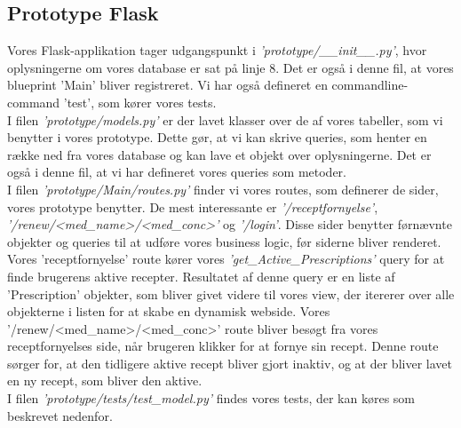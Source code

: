 \subsection{Prototype Flask}
Vores Flask-applikation tager udgangspunkt i \textit{'prototype/\_\_init\_\_.py'}, hvor oplysningerne om vores database er sat på linje 8. Det er også i denne fil, at vores blueprint 'Main' bliver registreret. Vi har også defineret en commandline-command 'test', som kører vores tests.\\
I filen \textit{'prototype/models.py'} er der lavet klasser over de af vores tabeller, som vi benytter i vores prototype. Dette gør, at vi kan skrive queries, som henter en række ned fra vores database og kan lave et objekt over oplysningerne. Det er også i denne fil, at vi har defineret vores queries som metoder.\\
I filen \textit{'prototype/Main/routes.py'} finder vi vores routes, som definerer de sider, vores prototype benytter. De mest interessante er \textit{'/receptfornyelse'}, \textit{'/renew/<med\_name>/<med\_conc>'} og \textit{'/login'}. Disse sider benytter førnævnte objekter og queries til at udføre vores business logic, før siderne bliver renderet. Vores 'receptfornyelse' route kører vores \textit{'get\_Active\_Prescriptions'} query for at finde brugerens aktive recepter. Resultatet af denne query er en liste af 'Prescription' objekter, som bliver givet videre til vores view, der itererer over alle objekterne i listen for at skabe en dynamisk webside. Vores '/renew/<med\_name>/<med\_conc>' route bliver besøgt fra vores receptfornyelses side, når brugeren klikker for at fornye sin recept. Denne route sørger for, at den tidligere aktive recept bliver gjort inaktiv, og at der bliver lavet en ny recept, som bliver den aktive.\\
I filen \textit{'prototype/tests/test\_model.py'} findes vores tests, der kan køres som beskrevet nedenfor.
